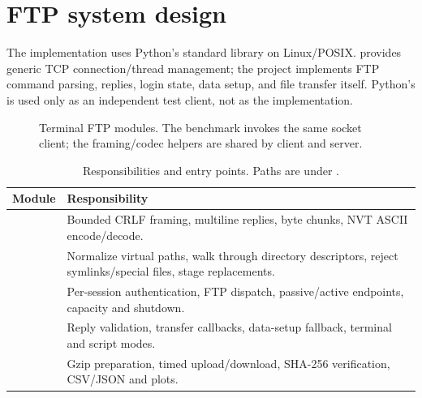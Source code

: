 \section{FTP system design}\label{sec:ftp-design}

The implementation uses Python's standard library on Linux/POSIX.  provides generic TCP connection/thread management; the project implements FTP command parsing, replies, login state, data setup, and file transfer itself. Python's  is used only as an independent test client, not as the implementation.

\begin{figure}[H]
\centering
{}
\caption{Terminal FTP modules. The benchmark invokes the same socket client; the framing/codec helpers are shared by client and server.}
\label{fig:ftp-modules}
\end{figure}

\begin{table}[H]
\centering\small
\caption{Responsibilities and entry points. Paths are under .}
\begin{tabularx}{\linewidth}{@{}l Y@{}}
\toprule
Module & Responsibility \\
\midrule
{} & Bounded CRLF framing, multiline replies, byte chunks, NVT ASCII encode/decode. \\
 & Normalize virtual paths, walk through directory descriptors, reject symlinks/special files, stage replacements. \\
 & Per-session authentication, FTP dispatch, passive/active endpoints, capacity and shutdown. \\
 & Reply validation, transfer callbacks, data-setup fallback, terminal and script modes. \\
 & Gzip preparation, timed upload/download, SHA-256 verification, CSV/JSON and plots. \\
\bottomrule
\end{tabularx}
\end{table}

